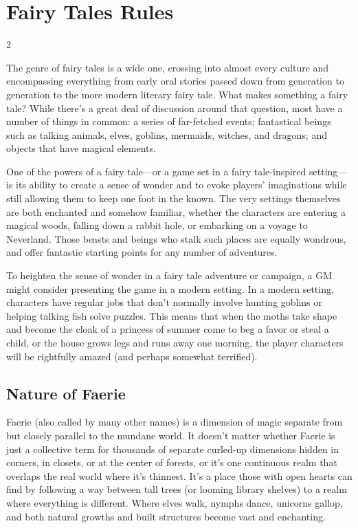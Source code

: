 \part{Fairy Tales Rules}

\begin{multicols}{2}

The genre of fairy tales is a wide one, crossing into almost every culture and encompassing everything from early oral stories passed down from generation to generation to the more modern literary fairy tale. What makes something a fairy tale? While there’s a great deal of discussion around that question, most have a number of things in common: a series of far-fetched events; fantastical beings such as talking animals, elves, goblins, mermaids, witches, and dragons; and objects that have magical elements.

One of the powers of a fairy tale—or a game set in a fairy tale-inspired setting—is its ability to create a sense of wonder and to evoke players’ imaginations while still allowing them to keep one foot in the known. The very settings themselves are both enchanted and somehow familiar, whether the characters are entering a magical woods, falling down a rabbit hole, or embarking on a voyage to Neverland. Those beasts and beings who stalk such places are equally wondrous, and offer fantastic starting points for any number of adventures. 

To heighten the sense of wonder in a fairy tale adventure or campaign, a GM might consider presenting the game in a modern setting. In a modern setting, characters have regular jobs that don’t normally involve hunting goblins or helping talking fish solve puzzles. This means that when the moths take shape and become the cloak of a princess of summer come to beg a favor or steal a child, or the house grows legs and runs away one morning, the player characters will be rightfully amazed (and perhaps somewhat terrified).

\chapter{Nature of Faerie}

Faerie (also called by many other names) is a dimension of magic separate from but closely parallel to the mundane world. It doesn’t matter whether Faerie is just a collective term for thousands of separate curled-up dimensions hidden in corners, in closets, or at the center of forests, or it’s one continuous realm that overlaps the real world where it’s thinnest. It’s a place those with open hearts can find by following a way between tall trees (or looming library shelves) to a realm where everything is different. Where elves walk, nymphs dance, unicorns gallop, and both natural growths and built structures become vast and enchanting.


\end{multicols}
